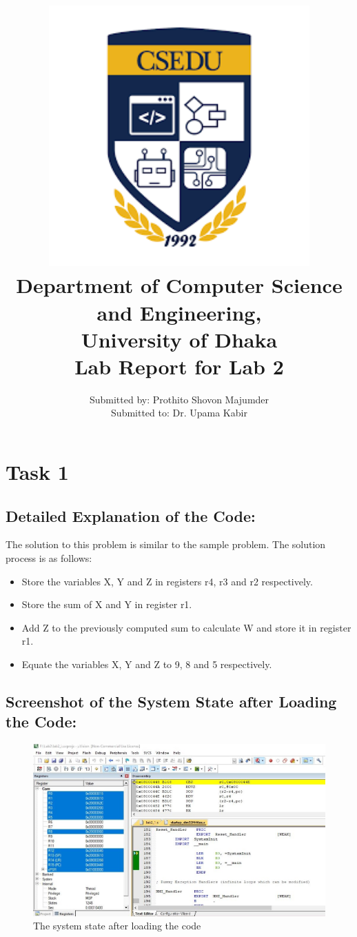 \documentclass[12pt]{article}
\title{
{\includegraphics[width=12cm, height=10cm]{images/csedu_logo.png}}\\
{\large Department of Computer Science and Engineering,\\      University of Dhaka}\\
{ Lab Report for Lab 2 }
}
\author{ Submitted by: Prothito Shovon Majumder \\ Submitted to: Dr. Upama Kabir }
\begin{document}
\maketitle

\newpage
\section{Task 1}

\subsection{Detailed Explanation of the Code:}
The solution to this problem is similar to the sample problem. The solution process is as follows: 
\begin{itemize}
    \item Store the variables X, Y and Z in registers r4, r3 and r2 respectively.
    \item Store the sum of X and Y in register r1.
    \item Add Z to the previously computed sum to calculate W and store it in register r1.
    \item Equate the variables X, Y and Z to 9, 8 and 5 respectively.
\end{itemize}
\subsection{Screenshot of the System State after Loading the Code:}
\begin{figure}[ht]
    \centering
    \includegraphics[scale=.7]{images/lab2_ss1.jpg}
    \caption{The system state after loading the code}
    \label{fig:before_task_one}
\end{figure}

\pagebreak
\end{document}
